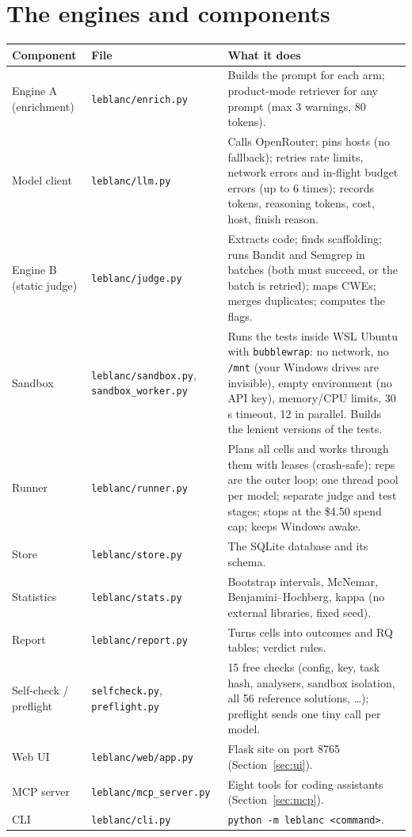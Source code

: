 \documentclass[11pt]{article}
\begin{document}
\section{The engines and components}
\begin{table}[H]\centering\small
\begin{tabular}{p{3.2cm}p{4.2cm}p{8cm}}
\toprule
Component & File & What it does\\
\midrule
Engine A (enrichment) & \texttt{leblanc/enrich.py} & Builds the prompt for each arm; product-mode retriever for
any prompt (max 3 warnings, 80 tokens).\\
Model client & \texttt{leblanc/llm.py} & Calls OpenRouter; pins hosts (no fallback); retries rate limits, network
errors and in-flight budget errors (up to 6 times); records tokens, reasoning tokens, cost, host, finish reason.\\
Engine B (static judge) & \texttt{leblanc/judge.py} & Extracts code; finds scaffolding; runs Bandit and Semgrep in
batches (both must succeed, or the batch is retried); maps CWEs; merges duplicates; computes the flags.\\
Sandbox & \texttt{leblanc/sandbox.py}, \texttt{sandbox\_worker.py} & Runs the tests inside WSL Ubuntu with
\texttt{bubblewrap}: no network, no \texttt{/mnt} (your Windows drives are invisible), empty environment (no API
key), memory/CPU limits, 30\,s timeout, 12 in parallel. Builds the lenient versions of the tests.\\
Runner & \texttt{leblanc/runner.py} & Plans all cells and works through them with leases (crash-safe); reps are the
outer loop; one thread pool per model; separate judge and test stages; stops at the \$4.50 spend cap; keeps
Windows awake.\\
Store & \texttt{leblanc/store.py} & The SQLite database and its schema.\\
Statistics & \texttt{leblanc/stats.py} & Bootstrap intervals, McNemar, Benjamini--Hochberg, kappa (no external
libraries, fixed seed).\\
Report & \texttt{leblanc/report.py} & Turns cells into outcomes and RQ tables; verdict rules.\\
Self-check / preflight & \texttt{selfcheck.py}, \texttt{preflight.py} & 15 free checks (config, key, task hash,
analysers, sandbox isolation, all 56 reference solutions, \dots); preflight sends one tiny call per model.\\
Web UI & \texttt{leblanc/web/app.py} & Flask site on port 8765 (Section~\ref{sec:ui}).\\
MCP server & \texttt{leblanc/mcp\_server.py} & Eight tools for coding assistants (Section~\ref{sec:mcp}).\\
CLI & \texttt{leblanc/cli.py} & \texttt{python -m leblanc <command>}.\\
\bottomrule
\end{tabular}
\end{table}
\end{document}
